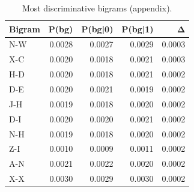 \begin{table}
\caption{Most discriminative bigrams (appendix).}
\label{tab:top_bigrams}
\begin{tabular}{lrrrr}
\toprule
Bigram & P(bg) & P(bg|0) & P(bg|1) & Δ \\
\midrule
N-W & 0.0028 & 0.0027 & 0.0029 & 0.0003 \\
X-C & 0.0020 & 0.0018 & 0.0021 & 0.0003 \\
H-D & 0.0020 & 0.0018 & 0.0021 & 0.0002 \\
D-E & 0.0020 & 0.0021 & 0.0019 & 0.0002 \\
J-H & 0.0019 & 0.0018 & 0.0020 & 0.0002 \\
D-I & 0.0020 & 0.0020 & 0.0021 & 0.0002 \\
N-H & 0.0019 & 0.0018 & 0.0020 & 0.0002 \\
Z-I & 0.0010 & 0.0009 & 0.0011 & 0.0002 \\
A-N & 0.0021 & 0.0022 & 0.0020 & 0.0002 \\
X-X & 0.0030 & 0.0029 & 0.0030 & 0.0002 \\
\bottomrule
\end{tabular}
\end{table}
